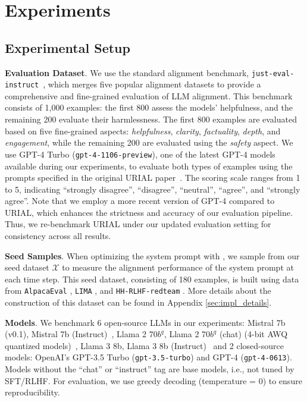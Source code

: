 \section{Experiments}


\subsection{Experimental Setup}





\noindent \textbf{Evaluation Dataset}.
We use the standard alignment benchmark, \texttt{just-eval-instruct}~\cite{Lin2024ReAlign}, which merges five popular alignment datasets to provide a comprehensive and fine-grained evaluation of LLM alignment. This benchmark consists of 1,000 examples: the first 800 assess the models' helpfulness, and the remaining 200 evaluate their harmlessness. The first 800 examples are evaluated based on five fine-grained aspects: \textit{helpfulness}, \textit{clarity}, \textit{factuality}, \textit{depth}, and \textit{engagement}, while the remaining 200 are evaluated using the \textit{safety} aspect. We use GPT-4 Turbo (\texttt{gpt-4-1106-preview}), one of the latest GPT-4 models available during our experiments, to evaluate both types of examples using the prompts specified in the original URIAL paper~\cite{Lin2024ReAlign}. The scoring scale ranges from 1 to 5, indicating ``strongly disagree'', ``disagree'', ``neutral'', ``agree'', and ``strongly agree''. Note that we employ a more recent version of GPT-4 compared to URIAL, which enhances the strictness and accuracy of our evaluation pipeline. Thus, we re-benchmark URIAL under our updated evaluation setting for consistency across all results.


\noindent \textbf{Seed Samples}. 
When optimizing the system prompt with \ours, we sample from our seed dataset $\mathcal{X}$ to measure the alignment performance of the system prompt at each time step. This seed dataset, consisting of 180 examples, is built using data from \texttt{AlpacaEval} \cite{alpaca_eval}, \texttt{LIMA} \cite{zhou2024lima}, and \texttt{HH-RLHF-redteam} \cite{Ganguli2022RedTL}. More details about the construction of this dataset can be found in Appendix \ref{sec:impl_details}.


\noindent \textbf{Models}.
We benchmark 6 open-source LLMs in our experiments: Mistral 7b (v0.1), Mistral 7b (Instruct)~\cite{Jiang2023Mistral7}, Llama 2 70$b^q$, Llama 2 70$b^q$ (chat) (4-bit AWQ~\cite{lin2023awq} quantized models)~\cite{Touvron2023Llama2O}, Llama 3 8b, Llama 3 8b (Instruct)~\cite{llama3modelcard} and 2 closed-source models: OpenAI's GPT-3.5 Turbo (\texttt{gpt-3.5-turbo}) and GPT-4 (\texttt{gpt-4-0613}). Models without the ``chat'' or ``instruct'' tag are base models, i.e., not tuned by SFT/RLHF. For evaluation, we use greedy decoding (temperature = 0) to ensure reproducibility.



